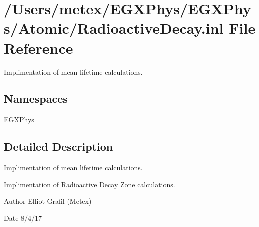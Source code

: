 \hypertarget{_radioactive_decay_8inl}{}\section{/\+Users/metex/\+E\+G\+X\+Phys/\+E\+G\+X\+Phys/\+Atomic/\+Radioactive\+Decay.inl File Reference}
\label{_radioactive_decay_8inl}


Implimentation of mean lifetime calculations.  


\subsection*{Namespaces}
\begin{DoxyCompactItemize}
\item 
 \hyperlink{namespace_e_g_x_phys}{E\+G\+X\+Phys}
\end{DoxyCompactItemize}


\subsection{Detailed Description}
Implimentation of mean lifetime calculations. 

Implimentation of Radioactive Decay Zone calculations.

\begin{DoxyAuthor}{Author}
Elliot Grafil (Metex) 
\end{DoxyAuthor}
\begin{DoxyDate}{Date}
8/4/17 
\end{DoxyDate}
